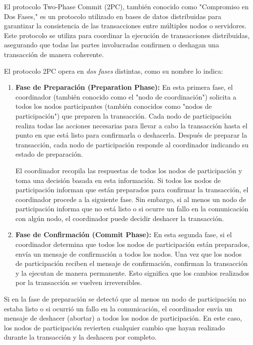 El protocolo Two-Phase Commit (2PC), también conocido como "Compromiso en Dos Fases," es un protocolo utilizado en bases de datos distribuidas para garantizar la consistencia de las transacciones entre múltiples nodos o servidores. Este protocolo se utiliza para coordinar la ejecución de transacciones distribuidas, asegurando que todas las partes involucradas confirmen o deshagan una transacción de manera coherente.

El protocolo 2PC opera en \textit{dos fases} distintas, como su nombre lo indica:

\begin{enumerate}
	\item \textbf{Fase de Preparación (Preparation Phase):} En esta primera fase, el coordinador (también conocido como el "nodo de coordinación") solicita a todos los nodos participantes (también conocidos como "nodos de participación") que preparen la transacción. Cada nodo de participación realiza todas las acciones necesarias para llevar a cabo la transacción hasta el punto en que está listo para confirmarla o deshacerla. Después de preparar la transacción, cada nodo de participación responde al coordinador indicando su estado de preparación.
	
	El coordinador recopila las respuestas de todos los nodos de participación y toma una decisión basada en esta información. Si todos los nodos de participación informan que están preparados para confirmar la transacción, el coordinador procede a la siguiente fase. Sin embargo, si al menos un nodo de participación informa que no está listo o si ocurre un fallo en la comunicación con algún nodo, el coordinador puede decidir deshacer la transacción.
	
	\item \textbf{Fase de Confirmación (Commit Phase):} En esta segunda fase, si el coordinador determina que todos los nodos de participación están preparados, envía un mensaje de confirmación a todos los nodos. Una vez que los nodos de participación reciben el mensaje de confirmación, confirman la transacción y la ejecutan de manera permanente. Esto significa que los cambios realizados por la transacción se vuelven irreversibles.
\end{enumerate}
Si en la fase de preparación se detectó que al menos un nodo de participación no estaba listo o si ocurrió un fallo en la comunicación, el coordinador envía un mensaje de deshacer (abortar) a todos los nodos de participación. En este caso, los nodos de participación revierten cualquier cambio que hayan realizado durante la transacción y la deshacen por completo.


